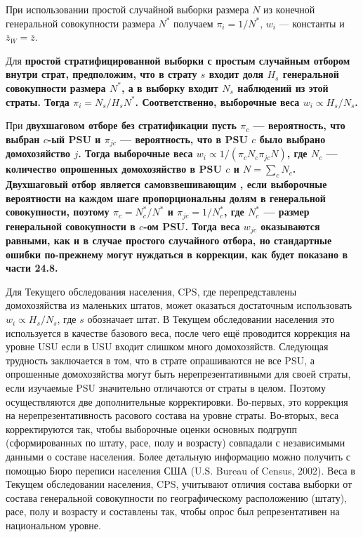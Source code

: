 При использовании простой случайной выборки размера $N$ из конечной генеральной совокупности размера $N^*$ получаем $\pi_i = 1/N^*$, $w_i$ --- константы и $\overline{z}_W = \overline{z}$. 

Для \bfseries простой стратифицированной выборки \mdseries с простым случайным отбором  внутри страт, предположим, что в страту $s$ входит доля $H_s$ генеральной совокупности размера $N^*$, а в выборку входит $N_s$ наблюдений из этой страты. Тогда  $\pi_i = N_s/H_sN^*$. Соответственно, выборочные веса $w_i \propto H_s/N_s$. 

При \bfseries двухшаговом отборе без стратификации \mdseries пусть $\pi_c$ --- вероятность, что выбран $c$-ый PSU и $\pi_{jc}$ --- вероятность, что в PSU $c$ было выбрано домохозяйство $j$. Тогда выборочные веса $w_i \propto 1/(\pi_c N_c \pi_{jc} N)$, где $N_c$ --- количество опрошенных домохозяйство в PSU $c$ и $N = \sum_c N_c$. Двухшаговый отбор является \bfseries самовзвешивающим \mdseries, если выборочные вероятности на каждом шаге пропорциональны долям в генеральной совокупности, поэтому $\pi_c = N^*_c/N^*$ и $\pi_{jc} = 1/N^*_c$, где $N^*_c$ --- размер генеральной совокупности в $c$-ом PSU. Тогда веса $w_{jc}$ оказываются равными, как и в случае простого случайного отбора, но стандартные ошибки по-прежнему могут нуждаться в коррекции, как будет показано в части 24.8. 

Для Текущего обследования населения, CPS, где перепредставлены домохозяйства из маленьких штатов, может оказаться достаточным использовать $w_i \propto H_s / N_s$, где $s$ обозначает штат. В Текущем обследовании населения это используется в качестве базового веса, после чего ещё проводится коррекция на уровне USU если в USU входит слишком много домохозяйств. Следующая трудность заключается в том, что в страте опрашиваются не все PSU, а опрошенные домохозяйства могут быть нерепрезентативными для своей страты, если изучаемые PSU значительно отличаются от страты в целом. Поэтому осуществляются две дополнительные корректировки. Во-первых, это коррекция на нерепрезентативность расового состава на уровне страты. Во-вторых, веса корректируются так, чтобы выборочные оценки основных подгрупп (сформированных по штату, расе, полу и возрасту) совпадали с независимыми данными о составе населения. Более детальную информацию можно получить с помощью Бюро переписи населения США (U.S. Bureau of Census, 2002). Веса в Текущем обследовании населения, CPS, учитывают отличия состава выборки от состава генеральной совокупности по географическому расположению (штату), расе, полу и возрасту и составлены так, чтобы опрос был репрезентативен на национальном уровне. 

